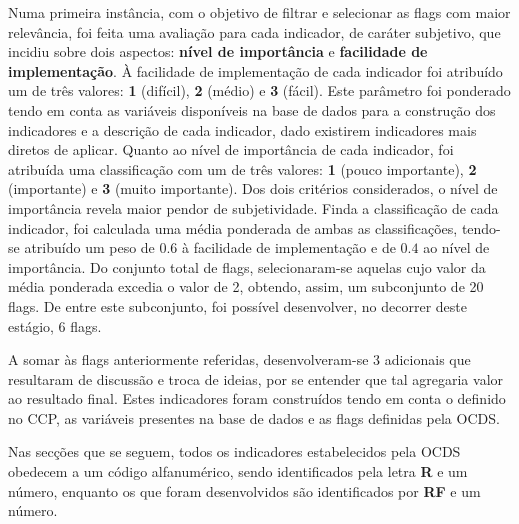 Numa primeira instância, com o objetivo de filtrar e selecionar as flags com maior relevância, foi feita uma avaliação para cada indicador, de caráter subjetivo, que incidiu sobre dois aspectos: \textbf{nível de importância} e \textbf{facilidade de implementação}. À facilidade de implementação de cada indicador foi atribuído um de três valores: \textbf{1} (difícil), \textbf{2} (médio) e \textbf{3} (fácil). Este parâmetro foi ponderado tendo em conta as variáveis disponíveis na base de dados para a construção dos indicadores e a descrição de cada indicador, dado existirem  indicadores mais diretos de aplicar. Quanto ao nível de importância de cada indicador, foi atribuída uma classificação com um de três valores: \textbf{1} (pouco importante), \textbf{2} (importante) e \textbf{3} (muito importante). Dos dois critérios considerados, o nível de importância revela maior pendor de subjetividade. Finda a classificação de cada indicador, foi calculada uma média ponderada de ambas as classificações, tendo-se atribuído um peso de $0.6$ à facilidade de implementação e de $0.4$ ao nível de importância. Do conjunto total de flags, selecionaram-se aquelas cujo valor da média ponderada excedia o valor de 2, obtendo, assim, um subconjunto de 20 flags. De entre este subconjunto, foi possível desenvolver, no decorrer deste estágio, 6 flags.




A somar às flags anteriormente referidas, desenvolveram-se 3 adicionais que resultaram de discussão e troca de ideias, por se entender que tal agregaria valor ao resultado final. Estes indicadores foram construídos tendo em conta o definido no CCP, as variáveis presentes na base de dados e as flags definidas pela OCDS.


Nas secções que se seguem, todos os indicadores estabelecidos pela OCDS obedecem a um código alfanumérico, sendo identificados pela letra \textbf{R} e um número, enquanto os que foram desenvolvidos são identificados por \textbf{RF} e um número.

